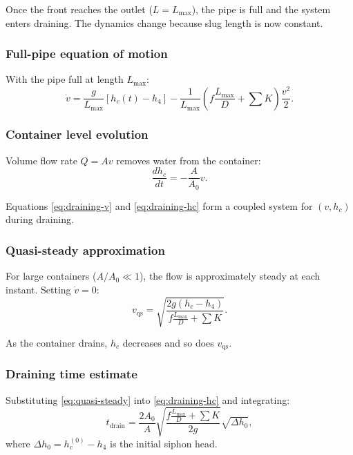 \documentclass[11pt]{article}
\begin{document}
Once the front reaches the outlet ($L = L_{\max}$), the pipe is full and the system enters draining. The dynamics change because slug length is now constant.

\subsubsection{Full-pipe equation of motion}

With the pipe full at length $L_{\max}$:
\begin{equation}
  \dot{v} = \frac{g}{L_{\max}}[h_c(t) - h_4] - \frac{1}{L_{\max}}\left(f\frac{L_{\max}}{D} + \sum K\right)\frac{v^2}{2}.
  \label{eq:draining-v}
\end{equation}

\subsubsection{Container level evolution}

Volume flow rate $Q = Av$ removes water from the container:
\begin{equation}
  \frac{dh_c}{dt} = -\frac{A}{A_0}v.
  \label{eq:draining-hc}
\end{equation}

Equations \eqref{eq:draining-v} and \eqref{eq:draining-hc} form a coupled system for $(v, h_c)$ during draining.

\subsubsection{Quasi-steady approximation}

For large containers ($A/A_0 \ll 1$), the flow is approximately steady at each instant. Setting $\dot{v} = 0$:
\begin{equation}
  v_{\text{qs}} = \sqrt{\frac{2g(h_c - h_4)}{f\frac{L_{\max}}{D} + \sum K}}.
  \label{eq:quasi-steady}
\end{equation}

As the container drains, $h_c$ decreases and so does $v_{\text{qs}}$.

\subsubsection{Draining time estimate}

Substituting \eqref{eq:quasi-steady} into \eqref{eq:draining-hc} and integrating:
\begin{equation}
  t_{\text{drain}} = \frac{2A_0}{A}\sqrt{\frac{f\frac{L_{\max}}{D} + \sum K}{2g}}\sqrt{\Delta h_0},
  \label{eq:drain-time}
\end{equation}
where $\Delta h_0 = h_c^{(0)} - h_4$ is the initial siphon head.
\end{document}
